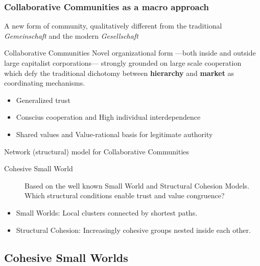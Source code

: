 \documentclass[ignorenonframetext,red,8pt]{beamer}
\begin{document}
\begin{frame}
\frametitle{Collaborative Communities as a macro approach}
A new form of community, qualitatively different from the traditional \emph{Gemeinschaft} and the modern \emph{Gesellschaft} \citep{tonnies:1974} 

\begin{block}{Collaborative Communities \citep{adler:2006}}
Novel organizational form ---both inside and outside large capitalist corporations--- strongly grounded on large scale cooperation which defy the traditional dichotomy between \textbf{hierarchy} and \textbf{market} as coordinating mechanisms.

\begin{itemize}
\item Generalized trust
\item Conscius cooperation and High individual interdependence
\item Shared values and Value-rational basis for legitimate authority 
\end{itemize}
\end{block}

\begin{block}{Network (structural) model for Collaborative Communities}

\begin{description}
\item[Cohesive Small World] Based on the well known Small World and Structural Cohesion Models. Which structural conditions enable trust and value congruence?
\end{description}

\begin{itemize}
\item Small Worlds: Local clusters connected by shortest paths.
\item Structural Cohesion: Increasingly cohesive groups nested inside each other.
\end{itemize}
\end{block}

\end{frame}

\subsection{Cohesive Small Worlds}
\end{document}
